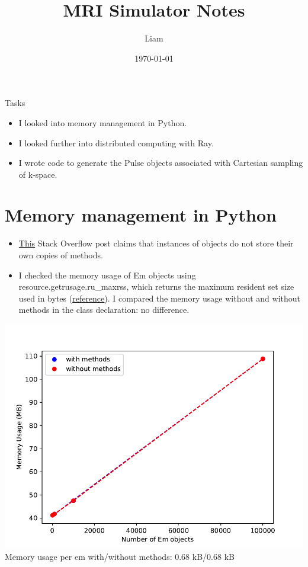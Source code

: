 \documentclass[dvipsnames]{beamer}
\title{MRI Simulator Notes}
\date{\today}
\author{Liam}
\begin{document}
\begin{frame}
\maketitle
\end{frame}

\begin{frame}{Tasks}
\begin{itemize}
\item I looked into memory management in Python.
\item I looked further into distributed computing with Ray.
\item I wrote code to generate the Pulse objects associated with Cartesian sampling of k-space.
\end{itemize}
\end{frame}

\section{Memory management in Python}

\begin{frame}
\begin{itemize}
\item \href{https://stackoverflow.com/questions/11939462/python-functions-in-a-class-and-memory}{This} Stack Overflow post claims that instances of objects do not store their own copies of methods.
\item I checked the memory usage of Em objects using resource.getrusage.ru\_maxrss, which returns the maximum resident set size used in bytes (\href{https://stackoverflow.com/questions/938733/total-memory-used-by-python-process}{reference}). I compared the memory usage without and without methods in the class declaration: no difference.
\end{itemize}
\end{frame}

\begin{frame}
\begin{center}
\includegraphics[height=0.8\textheight]{em_usage}
Memory usage per em with/without methods: 0.68 kB/0.68 kB
\end{center}
\end{frame}
\end{document}
